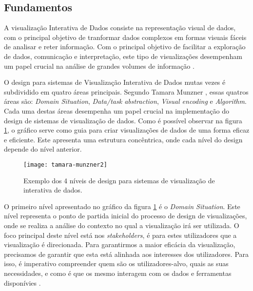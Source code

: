 \subsection{Fundamentos} %
\label{sub:fundamentos}
A visualização Interativa de Dados consiste na representação visual de dados, com o principal objetivo de tranformar dados complexos em formas visuais fáceis de analisar e reter informação. Com o principal objetivo de facilitar a exploração de dados, comunicação e interpretação, este tipo de visualizações desempenham um papel crucial na análise de grandes volumes de informação \cite{keim2002information}.
                                                                                                                        
O design para sistemas de Visualização Interativa de Dados mutas vezes é subdividido em quatro áreas principais. Segundo Tamara Munzner \cite{munzner2014visualization}, essas quatros áreas são: \textit{Domain Situation}, \textit{Data/task abstraction}, \textit{Visual encoding} e \textit{Algorithm}. Cada uma destas áreas desempenha um papel crucial na implementação do design de sistemas de visualização de dados. Como é possível observar na figura \ref{fig:tamara-munzner-principles}, o gráfico serve como guia para criar visualizações de dados de uma forma eficaz e eficiente. Este apresenta uma estrutura concêntrica, onde cada nível do design depende do nível anterior.

\begin{figure}[htbp]
  \centering
  \texttt{[image: tamara-munzner2]}
  \caption{Exemplo dos 4 níveis de design para sistemas de visualização de interativa de dados.}
  \label{fig:tamara-munzner-principles}
\end{figure}

O primeiro nível apresentado no gráfico da figura \ref{fig:tamara-munzner-principles} é o \textit{Domain Situation}. Este nível representa o ponto de partida inicial do processo de design de visualizações, onde se realiza a análise do contexto no qual a visualização irá ser utilizada. O foco principal deste nível está nos \textit{stakeholders}, é para estes utilizadores que a visualização é direcionada.
Para garantirmos a maior eficácia da visualização, precisamos de garantir que esta está alinhada aos interesses dos utilizadores. Para isso, é imperativo compreender quem são os utilizadores-alvo, quais as suas necessidades, e como é que os mesmo interagem com os dados e ferramentas disponívies \cite{courage2005understanding}.

